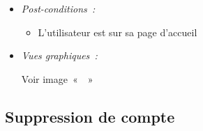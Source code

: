 \begin{itemize}
\item \textit{Post-conditions~:}

    \begin{itemize}
        \item L'utilisateur est sur sa page d'accueil
    \end{itemize}
    
\item \textit{Vues graphiques~:}

Voir image~«~~»

\end{itemize}

\subsection{Suppression de compte}

